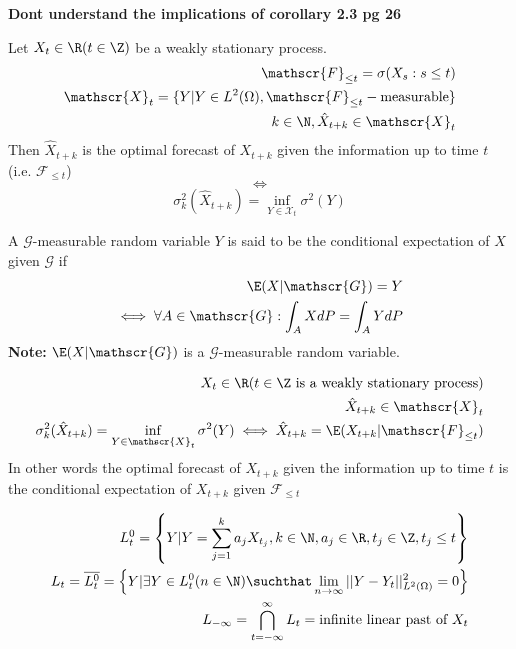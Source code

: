 \documentclass[answers,12pt,addpoints]{exam}
\begin{document}
\textbf{Dont understand the implications of corollary 2.3 pg 26}
\begin{definition}
    Let $X_t \in \R (t \in \Z)$ be a weakly stationary process. \\
    \begin{align*}
        \mathscr{F}_{\leq t} = \sigma(X_s: s \leq t)\\
        \mathscr{X}_t = \{ Y | Y \in L^2(\Omega), \mathscr{F}_{\leq t}-\text{measurable} \}\\
        k \in \N, \hat{X}_{t+k} \in \mathscr{X}_t
    \end{align*}
    Then $\hat{X}_{t+k}$ is the optimal forecast of $X_{t+k}$ given the information up to time $t$ (i.e. $\mathscr{F}_{\leq t}$)
    $$\iff$$
    $$\sigma_k^2(\hat{X}_{t+k}) = \inf_{Y \in \mathscr{X}_t} \sigma^2(Y)$$
\end{definition}
\begin{definition}
    A $\mathscr{G}$-measurable random variable $Y$ is said to be the conditional expectation of $X$ given $\mathscr{G}$ if
    \begin{align*}
        \E(X | \mathscr{G}) = Y \\
        \iff \forall A \in \mathscr{G}: \int_A X dP = \int_A Y dP
    \end{align*}
    \textbf{Note:} $\E(X | \mathscr{G})$ is a $\mathscr{G}$-measurable random variable.\\
\end{definition}
\begin{corollary}
    \begin{align*}
        X_t \in \R (t \in \Z \text{ is a weakly stationary process})\\
        \hat{X}_{t+k} \in \mathscr{X}_t\\
        \sigma_k^2(\hat{X}_{t+k}) = \inf_{Y \in \mathscr{X}_t} \sigma^2(Y) \iff \hat{X}_{t+k} = \E(X_{t+k} | \mathscr{F}_{\leq t})\\
    \end{align*}
    In other words the optimal forecast of $X_{t+k}$ given the information up to time $t$ is the conditional expectation of $X_{t+k}$ given $\mathscr{F}_{\leq t}$
\end{corollary}
\begin{definition}
    \begin{align*}
        L_t^0 = \left\{Y | Y = \sum_{j=1}^k a_j X_{t_j}, k \in \N, a_j \in \R, t_j \in \Z, t_j \leq t \right\}\\
        L_t = \overline{L_t^0} = \left\{Y | \exists Y \in L_t^0 (n \in \N) \suchthat \lim_{n\to \infty} || Y - Y_t||^2_{L^2(\Omega)} = 0\right\}\\
        L_{-\infty} = \bigcap_{t = -\infty}^{\infty} L_t = \text{infinite linear past of $X_t$}
    \end{align*}
\end{definition}
\end{document}
